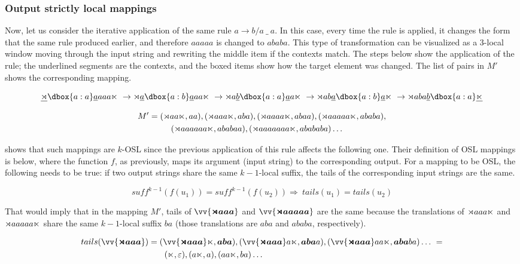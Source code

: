 \subsubsection{Output strictly local mappings}

Now, let us consider the iterative application of the same rule $a \rightarrow b / a~ \_~ a$.
In this case, every time the rule is applied, it changes the form that the same rule produced earlier, and therefore $aaaaa$ is changed to $ababa$.
This type of transformation can be visualized as a $3$-local window moving through the input string and rewriting the middle item if the contexts match.
The steps below show the application of the rule; the underlined segments are the contexts, and the boxed items show how the target element was changed.
The list of pairs in $M'$ shows the corresponding mapping.

$$
\underline{\bow}\dbox{a:a}\underline{a}aaa\eow~ \rightarrow
\bow\underline{a}\dbox{a:b}\underline{a}aa\eow~ \rightarrow
\bow a\underline{b}\dbox{a:a}\underline{a}a\eow~ \rightarrow
\bow ab\underline{a}\dbox{a:b}\underline{a}\eow~ \rightarrow
\bow aba\underline{b}\dbox{a:a}\underline{\eow}
$$

\begin{multline*}
M' = (\bow aa\eow, aa), (\bow aaa\eow, aba), (\bow aaaa\eow, abaa), (\bow aaaaa\eow, ababa), \\
 \qquad\quad \shoveleft{(\bow aaaaaa\eow, ababaa), (\bow aaaaaaa\eow, abababa)\dots}
\end{multline*}

\cite{ChandleeEtAl2015} shows that such mappings are $k$-OSL since the previous application of this rule affects the following one.
Their definition of OSL mappings is below, where the function $f$, as previously, maps its argument (input string) to the corresponding output.
For a mapping to be OSL, the following needs to be true: if two output strings share the same $k-1$-local suffix, the tails of the corresponding input strings are the same.


\[
	suff^{k-1}(f(u_1)) = suff^{k-1}(f(u_2)) \Rightarrow~ tails(u_1) = tails(u_2)
\]

That would imply that in the mapping $M'$, tails of $\vv{\bm{\bow aaa}}$ and $\vv{\bm{\bow aaaaa}}$ are the same because the translations of $\rtimes aaa\ltimes$ and $\rtimes aaaaa\ltimes$ share the same $k-1$-local suffix $ba$ (those translations are $aba$ and $ababa$, respectively).

\begin{multline*}
tails(\vv{\bm{\bow aaa}}) = (\vv{\bm{\bow aaa}}\eow, \bm{aba}), (\vv{\bm{\bow aaa}}a\eow, \bm{aba}a), (\vv{\bm{\bow aaa}}aa\eow, \bm{aba}ba) \dots~ =  \\
 \qquad\qquad\qquad\qquad\quad \shoveleft{(\eow, \varepsilon), (a\eow, a), (aa\eow, ba) \dots}
\end{multline*}

